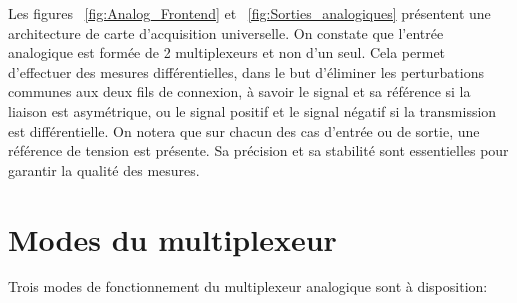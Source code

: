 Les figures ~\ref{fig:Analog_Frontend} et ~\ref{fig:Sorties_analogiques} présentent une architecture de carte d'acquisition universelle. On constate que l'entrée analogique est formée de 2 multiplexeurs et non d'un seul. Cela permet d'effectuer des mesures différentielles, dans le but d'éliminer les perturbations communes aux deux fils de connexion, à savoir le signal et sa référence si la liaison est asymétrique, ou le signal positif et le signal négatif si la transmission est différentielle. On notera que sur chacun des cas d'entrée ou de sortie, une référence de tension est présente. Sa précision et sa stabilité sont essentielles pour garantir la qualité des mesures.

\section{Modes du multiplexeur}

Trois modes de fonctionnement du multiplexeur analogique sont à disposition:

